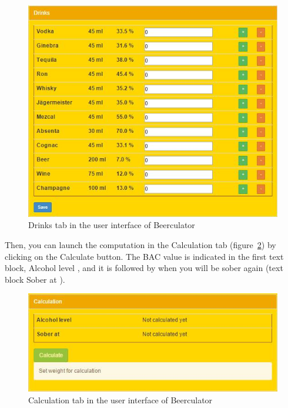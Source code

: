 \begin{figure}[H]
	\centering
   \includegraphics[scale=0.65]{./figures/drinks_tab.jpg}
   \caption{Drinks tab in the user interface of Beerculator}
   \label{fig:drinks}
\end{figure}

Then, you can launch the computation in the \guillemotleft{} Calculation \guillemotright{} tab ({\sc figure}~\ref{fig:calcul}) by clicking on the \guillemotleft{} Calculate \guillemotright{} button. The BAC value is indicated in the first text block, \guillemotleft{} Alcohol level \guillemotright{}, and it is followed by when you will be sober again (text block \guillemotleft{} Sober at \guillemotright{}).

\begin{figure}[H]
	\centering
   \includegraphics[scale=0.65]{./figures/calcul.jpg}
   \caption{Calculation tab in the user interface of Beerculator}
   \label{fig:calcul}
\end{figure}
